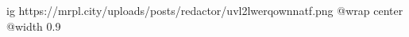  
 
 
 
 

\ifcmt
  ig https://mrpl.city/uploads/posts/redactor/uvl2lwerqownnatf.png
  @wrap center
  @width 0.9
\fi
